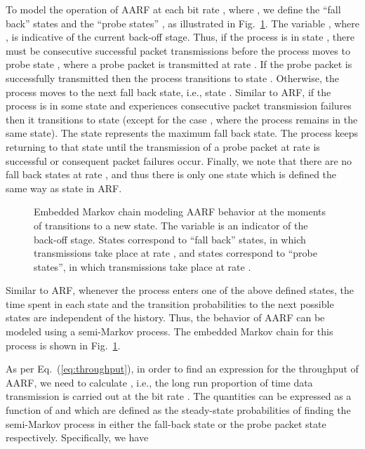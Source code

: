 \documentclass[11pt, journal, letterpaper, oneside, onecolumn]{IEEEtran}
\newcommand{\linegap}{1}
\begin{document}
To model the operation of AARF at each bit rate , where , we define the ``fall back'' states  and
the ``probe states'' , as illustrated in
Fig.~\ref{fig:AARF-macro}. The variable , where , is indicative of the current back-off
stage. Thus, if the process is in state , there must be
 consecutive successful packet transmissions before
the process moves to probe state , where a probe
packet is transmitted at rate . If the probe packet is
successfully transmitted then the process transitions to state
. Otherwise, the process moves to the next fall back
state, i.e., state . Similar to ARF, if the process
is in some state  and experiences  consecutive
packet transmission failures then it transitions to state
 (except for the case , where the process
remains in the same state). The state  represents
the maximum fall back state. The process keeps returning to that
state until the transmission of a probe packet at rate 
is successful or  consequent packet failures occur. Finally, we
note that there are no fall back states at rate , and thus
there is only one state  which is defined the same way as
state  in ARF.

\begin{figure}[t]
\centering
{}
\caption{Embedded Markov chain modeling AARF behavior at the
moments of transitions to a new state. The variable  is an
indicator of the back-off stage. States  correspond to
``fall back'' states, in which transmissions take place at rate
, and states  correspond to ``probe states'',
in which transmissions take place at rate .}
\label{fig:AARF-macro}
\end{figure}\renewcommand{\baselinestretch}{\linegap}





Similar to ARF, whenever the process enters one of the above
defined states, the time spent in each state and the transition
probabilities to the next possible states are independent of the
history. Thus, the behavior of AARF can be modeled using a
semi-Markov process. The embedded Markov chain for this process is
shown in Fig.~\ref{fig:AARF-macro}.










As per Eq.~(\ref{eq:throughput}), in order to find an expression
for the throughput of AARF, we need to calculate , i.e.,
the long run proportion of time data transmission is carried out
at the bit rate . The quantities  can be expressed
as a function of  and 
which are defined as the steady-state probabilities of finding the
semi-Markov process in either the fall-back state  or
the probe packet state  respectively.
Specifically, we have
\end{document}
